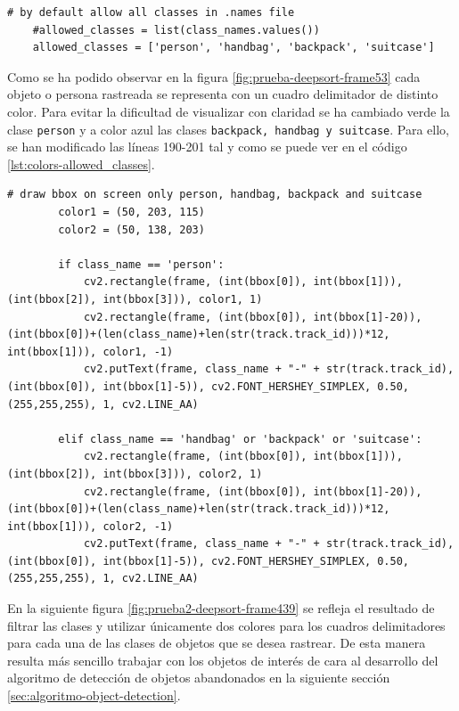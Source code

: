 \vspace{0.5cm}
\begin{lstlisting}[language=iPython,caption=Clases permitidas en el seguimiento de objetos con Deep SORT,captionpos=b,label={lst:allowed_classes}]
    # by default allow all classes in .names file
    #allowed_classes = list(class_names.values())
    allowed_classes = ['person', 'handbag', 'backpack', 'suitcase']
\end{lstlisting}

Como se ha podido observar en la figura \ref{fig:prueba-deepsort-frame53} cada objeto o persona rastreada se representa con un cuadro delimitador de distinto color. Para evitar la dificultad de visualizar con claridad se ha cambiado verde la clase \texttt{person} y a color azul las clases \texttt{backpack, handbag y suitcase}. Para ello, se han modificado las líneas 190-201 tal y como se puede ver en el código \ref{lst:colors-allowed_classes}.

\vspace{0.5cm}
\begin{lstlisting}[language=iPython,caption=Colores y cuadros delimitadores de las clases en el seguimiento,captionpos=b,label={lst:colors-allowed_classes}]
        # draw bbox on screen only person, handbag, backpack and suitcase
        color1 = (50, 203, 115)
        color2 = (50, 138, 203)

        if class_name == 'person':
            cv2.rectangle(frame, (int(bbox[0]), int(bbox[1])), (int(bbox[2]), int(bbox[3])), color1, 1)
            cv2.rectangle(frame, (int(bbox[0]), int(bbox[1]-20)), (int(bbox[0])+(len(class_name)+len(str(track.track_id)))*12, int(bbox[1])), color1, -1)
            cv2.putText(frame, class_name + "-" + str(track.track_id),(int(bbox[0]), int(bbox[1]-5)), cv2.FONT_HERSHEY_SIMPLEX, 0.50, (255,255,255), 1, cv2.LINE_AA)

        elif class_name == 'handbag' or 'backpack' or 'suitcase':
            cv2.rectangle(frame, (int(bbox[0]), int(bbox[1])), (int(bbox[2]), int(bbox[3])), color2, 1)
            cv2.rectangle(frame, (int(bbox[0]), int(bbox[1]-20)), (int(bbox[0])+(len(class_name)+len(str(track.track_id)))*12, int(bbox[1])), color2, -1)
            cv2.putText(frame, class_name + "-" + str(track.track_id),(int(bbox[0]), int(bbox[1]-5)), cv2.FONT_HERSHEY_SIMPLEX, 0.50, (255,255,255), 1, cv2.LINE_AA)
\end{lstlisting}

En la siguiente figura \ref{fig:prueba2-deepsort-frame439} se refleja el resultado de filtrar las clases y utilizar únicamente dos colores para los cuadros delimitadores para cada una de las clases de objetos que se desea rastrear. De esta manera resulta más sencillo trabajar con los objetos de interés de cara al desarrollo del algoritmo de detección de objetos abandonados en la siguiente sección \ref{sec:algoritmo-object-detection}.

